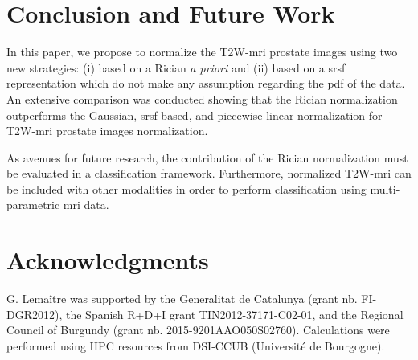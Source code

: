 \section{Conclusion and Future Work}
\label{sec:con}
In this paper, we propose to normalize the T2W-\ac{mri} prostate images using two new strategies: (i) based on a Rician \textit{a priori} and (ii) based on a \ac{srsf} representation which do not make any assumption regarding the \ac{pdf} of the data.
An extensive comparison was conducted showing that the Rician normalization outperforms the Gaussian, \ac{srsf}-based, and piecewise-linear normalization for T2W-\ac{mri} prostate images normalization.

As avenues for future research, the contribution of the Rician normalization must be evaluated in a classification framework. Furthermore, normalized T2W-\ac{mri} can be included with other modalities in order to perform classification using multi-parametric \ac{mri} data.

\section*{Acknowledgments}

G. Lema\^itre was supported by the Generalitat de Catalunya (grant nb. FI-DGR2012), the Spanish R+D+I grant TIN2012-37171-C02-01, and the Regional Council of Burgundy (grant nb. 2015-9201AAO050S02760).
Calculations were performed using HPC resources from DSI-CCUB (Universit\'e de Bourgogne).

